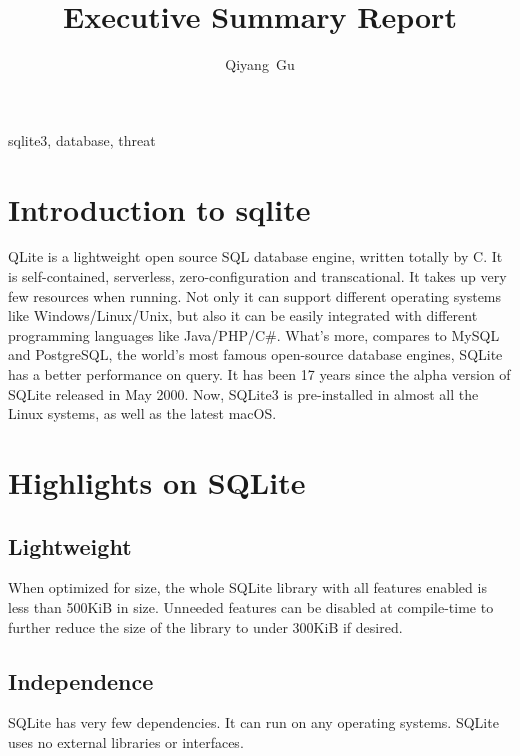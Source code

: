 \documentclass[journal]{IEEEtran}
\begin{document}
\title{Executive Summary Report}
\author{Qiyang~Gu}
\maketitle


\begin{abstract}
\blindtext
\end{abstract}

\begin{IEEEkeywords}
sqlite3, database, threat
\end{IEEEkeywords}



\section{Introduction to sqlite}
QLite is a lightweight open source SQL database engine, written totally by C.  It is self-contained, serverless, zero-configuration and transcational. It takes up very few resources when running.  Not only it can support different operating systems like Windows/Linux/Unix, but also it can be easily integrated with different programming languages like Java/PHP/C\#. What's more, compares to MySQL and PostgreSQL, the world's most famous open-source database engines, SQLite has a better performance on query. It has been 17 years since the alpha version of SQLite released in May 2000. Now, SQLite3 is pre-installed in almost all the Linux systems, as well as the latest macOS.


\section{Highlights on SQLite}
\subsection{Lightweight}
When optimized for size, the whole SQLite library with all features enabled is less than 500KiB in size. Unneeded features can be disabled at compile-time to further reduce the size of the library to under 300KiB if desired.

\subsection{Independence}
SQLite has very few dependencies. It can run on any operating systems. SQLite uses no external libraries or interfaces.
\end{document}
